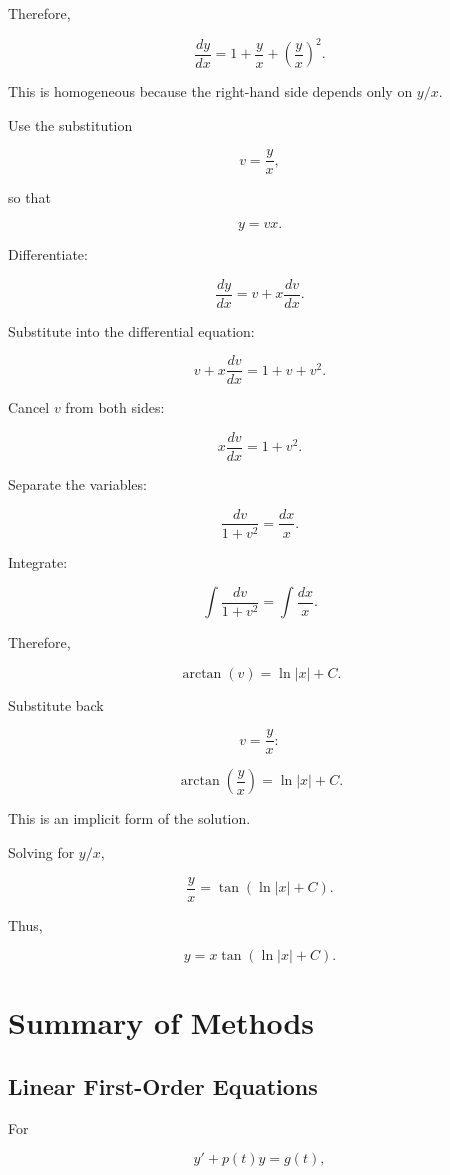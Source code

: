 \documentclass[11pt]{article}
\begin{document}
Therefore,

\[
\frac{dy}{dx}
=
1+\frac{y}{x}
+\left(\frac{y}{x}\right)^2.
\]

This is homogeneous because the right-hand side depends only on
$y/x$.

Use the substitution

\[
v=\frac{y}{x},
\]

so that

\[
y=vx.
\]

Differentiate:

\[
\frac{dy}{dx}
=
v+x\frac{dv}{dx}.
\]

Substitute into the differential equation:

\[
v+x\frac{dv}{dx}
=
1+v+v^2.
\]

Cancel $v$ from both sides:

\[
x\frac{dv}{dx}
=
1+v^2.
\]

Separate the variables:

\[
\frac{dv}{1+v^2}
=
\frac{dx}{x}.
\]

Integrate:

\[
\int\frac{dv}{1+v^2}
=
\int\frac{dx}{x}.
\]

Therefore,

\[
\arctan(v)
=
\ln|x|+C.
\]

Substitute back

\[
v=\frac{y}{x}:
\]

\[
\arctan\left(\frac{y}{x}\right)
=
\ln|x|+C.
\]

This is an implicit form of the solution.

Solving for $y/x$,

\[
\frac{y}{x}
=
\tan(\ln|x|+C).
\]

Thus,

\[
\boxed{
y
=
x\tan(\ln|x|+C)
}.
\]

\section{Summary of Methods}

\subsection{Linear First-Order Equations}

For

\[
y'+p(t)y=g(t),
\]
\end{document}
